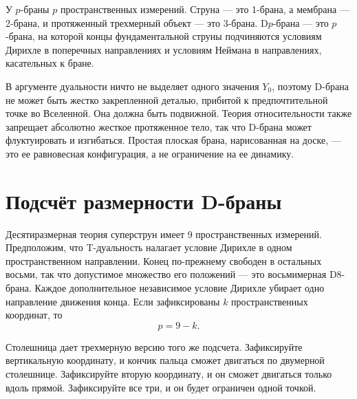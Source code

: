 У \(p\)-браны \(p\) пространственных измерений. Струна — это 1-брана, а
мембрана — 2-брана, и протяженный трехмерный объект — это
3-брана. D\(p\)-брана — это \(p\)-брана, на которой концы фундаментальной струны
подчиняются условиям Дирихле в поперечных направлениях и
условиям Неймана в направлениях, касательных к бране.

В аргументе дуальности ничто не выделяет одного значения \(Y_0\), поэтому
D-брана не может быть жестко закрепленной деталью, прибитой к предпочтительной точке во
Вселенной. Она должна быть подвижной. Теория относительности также запрещает абсолютно жесткое
протяженное тело, так что D-брана может флуктуировать и изгибаться.
Простая плоская брана, нарисованная на доске, — это ее равновесная конфигурация, а не
ограничение на ее динамику.

\begin{classroomqa}
\end{classroomqa}

\section{Подсчёт размерности D-браны}

Десятиразмерная теория суперструн имеет 9 пространственных измерений. Предположим, что
T-дуальность налагает условие Дирихле в одном пространственном направлении. Конец
по-прежнему свободен в остальных восьми, так что допустимое множество его положений — это
восьмимерная D8-брана. Каждое дополнительное независимое
условие Дирихле убирает одно направление движения конца. Если зафиксированы \(k\) пространственных
координат, то
\begin{equation}
  p=9-k.
  \label{eq:l10-dp-counting}
\end{equation}

Столешница дает трехмерную версию того же подсчета. Зафиксируйте
вертикальную координату, и кончик пальца сможет двигаться по двумерной
столешнице. Зафиксируйте вторую координату, и он сможет двигаться только вдоль прямой. Зафиксируйте
все три, и он будет ограничен одной точкой.

